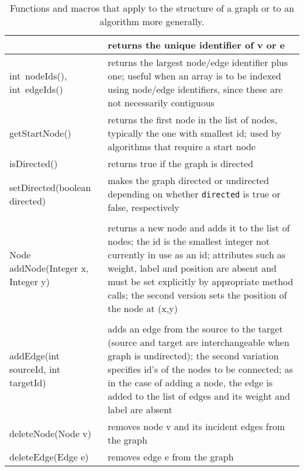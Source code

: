 \begin{table}
\begin{tabular}{| m{} | m{} |}
    &
    returns the unique identifier of \textsf{v} or \textsf{e}
    \\ \hline
    \textsf{int~nodeIds()}, \textsf{int~edgeIds()}
    &
    returns the largest node/edge identifier plus one;
    useful when an array is to be indexed using node/edge identifiers,
    since these are not necessarily contiguous
    \\ \hline
    \textsf{getStartNode()}
    &
    returns the first node in the list of nodes, typically the one with smallest id;
    used by algorithms that require a start node
    \\ \hline
    \textsf{isDirected()}
    &
    returns true if the graph is directed
    \\ \hline
    \textsf{setDirected(boolean directed)}
    &
    makes the graph directed or undirected depending on whether \texttt{directed}
    is true or false, respectively
    \\ \hline
    \shortstack[l]{
      \textsf{Node addNode()}\\
      \textsf{Node addNode(Integer x, Integer y)}
    }
    &
    returns a new node and adds it to the list of nodes;
    the id is the smallest integer not currently in use as an id;
    attributes such as weight, label and position are absent and must be set explicitly
    by appropriate method calls;
    the second version sets the position of the node at \textsf{(x,y)}
    \\ \hline
    \raisebox{-5ex}{
      \shortstack[l]{
        \textsf{addEdge(Node source, Node target)}\\
        \textsf{addEdge(int sourceId, int targetId)}
      }
    }
    &
    adds an edge from the source to
    the target (source and target are interchangeable when graph is undirected);
    the second variation specifies id's of the nodes to be connected;
    as in the case of adding a node, the edge is added to the list of edges and
    its weight and label are absent
    \\ \hline
    \textsf{deleteNode(Node v)}
    &
    removes node \textsf{v} and its incident edges from the graph
    \\ \hline
    \textsf{deleteEdge(Edge e)}
    &
    removes edge \textsf{e} from the graph
    \\ \hline
  \end{tabular}
  \caption{Functions and macros that apply to the structure of a graph or to
    an algorithm more generally.}
  \label{tab:graph_functions}
\end{table}
